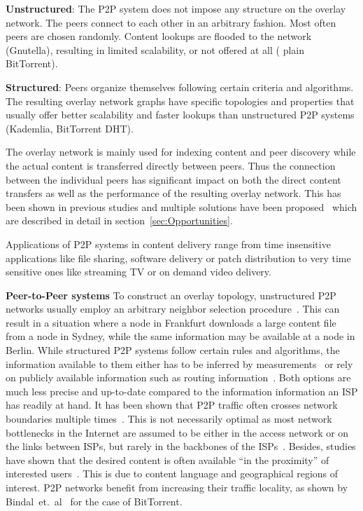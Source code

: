 \textbf{Unstructured}: The P2P system does not impose any structure on the
overlay network. The peers connect to each other in an arbitrary fashion. Most
often peers are chosen randomly. Content lookups are flooded to the network
(\eg Gnutella), resulting in limited scalability, or not offered at all (\eg
plain BitTorrent).

\textbf{Structured}: Peers organize themselves following certain criteria and
algorithms. The resulting overlay network graphs have specific topologies and
properties that usually offer better scalability and faster lookups than
unstructured P2P systems (\eg Kademlia, BitTorrent DHT).

The overlay network is mainly used for indexing content and peer discovery
while the actual content is transferred directly between peers. Thus the
connection between the individual peers has significant impact on both the
direct content transfers as well as the performance of the resulting overlay
network. This has been shown in previous studies and multiple solutions have
been
proposed~\cite{p4p,taming,DraftingAkamai:SIGCOMM2006,afs-cispp2pcip-ccr07,ietf-alto-protocol,CDNi}
which are described in detail in section~\ref{sec:Opportunities}.

Applications of P2P systems in content delivery range from time insensitive
applications like file sharing, software delivery or patch distribution to very
time sensitive ones like streaming TV or on demand video delivery.

\noindent\textbf{Peer-to-Peer systems} To construct an overlay topology,
unstructured P2P networks usually employ an arbitrary neighbor selection
procedure~\cite{P2P-LNCS-05}. This can result in a situation where a node in
Frankfurt downloads a large content file from a node in Sydney, while the same
information may be available at a node in Berlin. While structured P2P systems
follow certain rules and algorithms, the information available to them either
has to be inferred by measurements~\cite{rhks-taocss-02} or rely on publicly
available information such as routing information~\cite {Routeviews}. Both
options are much less precise and up-to-date compared to the information
information an ISP has readily at hand.  It has been shown that P2P traffic
often crosses network boundaries multiple
times~\cite{abfw-mendg-04,krp-sifpacd-05}. This is not necessarily optimal as
most network bottlenecks in the Internet are assumed to be either in the access
network or on the links between ISPs, but rarely in the backbones of the
ISPs~\cite{ass-eewib-03}. Besides, studies have shown that the desired content
is often available ``in the proximity'' of interested
users~\cite{krp-sifpacd-05,rsr-oletgo-06}. This is due to content language and
geographical regions of interest. P2P networks benefit from increasing their
traffic locality, as shown by Bindal~et.~al~\cite{b-itlbbns-06} for the case of
BitTorrent.

